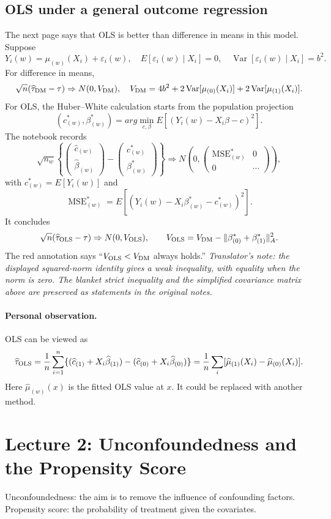 \subsection{OLS under a general outcome regression}
The next page says that OLS is better than difference in means in this model. Suppose
\[
Y_i(w)=\mu_{(w)}(X_i)+\varepsilon_i(w),\quad
E[\varepsilon_i(w)\mid X_i]=0,\quad
\operatorname{Var}[\varepsilon_i(w)\mid X_i]=b^2.
\]
For difference in means,
\[
\sqrt n(\widehat\tau_{\rm DM}-\tau)\Rightarrow N(0,V_{\rm DM}),\quad
V_{\rm DM}=4b^2+2\operatorname{Var}[\mu_{(0)}(X_i)]
+2\operatorname{Var}[\mu_{(1)}(X_i)].
\]
For OLS, the Huber--White calculation starts from the population projection
\[
(c^*_{(w)},\beta^*_{(w)})=arg\min_{c,\beta}
 E[(Y_i(w)-X_i\beta-c)^2].
\]
The notebook records
\[
\sqrt{n_w}\left\{\begin{pmatrix}\widehat c_{(w)}\\\widehat\beta_{(w)}\end{pmatrix}
-\begin{pmatrix}c^*_{(w)}\\\beta^*_{(w)}\end{pmatrix}\right\}
\Rightarrow N\left(0,\begin{pmatrix}\operatorname{MSE}^*_{(w)}&0\\0&\cdots\end{pmatrix}\right),
\]
with $c^*_{(w)}=E[Y_i(w)]$ and
\[
\operatorname{MSE}^*_{(w)}=E[(Y_i(w)-X_i\beta^*_{(w)}-c^*_{(w)})^2].
\]
It concludes
\[
\sqrt n(\widehat\tau_{\rm OLS}-\tau)\Rightarrow N(0,V_{\rm OLS}),\qquad
V_{\rm OLS}=V_{\rm DM}-\|\beta^*_{(0)}+\beta^*_{(1)}\|_A^2.
\]
The red annotation says ``$V_{\rm OLS}<V_{\rm DM}$ always holds.''
\textit{Translator's note: the displayed squared-norm identity gives a weak inequality, with equality when the norm is zero. The blanket strict inequality and the simplified covariance matrix above are preserved as statements in the original notes.}
\paragraph{Personal observation.}
OLS can be viewed as
\[
\widehat\tau_{\rm OLS}=\frac1n\sum_{i=1}^n
\{(\widehat c_{(1)}+X_i\widehat\beta_{(1)})
 -(\widehat c_{(0)}+X_i\widehat\beta_{(0)})\}
=\frac1n\sum_i[\widehat\mu_{(1)}(X_i)-\widehat\mu_{(0)}(X_i)].
\]
Here $\widehat\mu_{(w)}(x)$ is the fitted OLS value at $x$. It could be replaced with another method.

\section{Lecture 2: Unconfoundedness and the Propensity Score}
Unconfoundedness: the aim is to remove the influence of confounding factors. Propensity score: the probability of treatment given the covariates.

